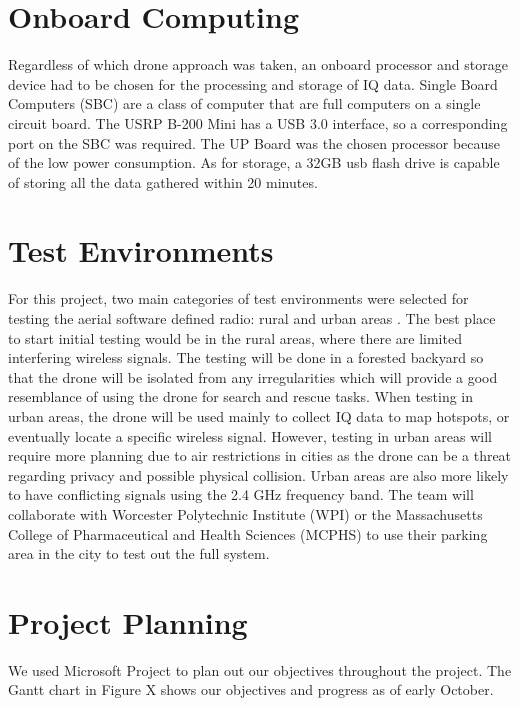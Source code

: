 \section{Onboard Computing}
Regardless of which drone approach was taken, an onboard processor and storage device had to be chosen for the processing and storage of IQ data. Single Board Computers (SBC) are a class of computer that are full computers on a single circuit board. The USRP B-200 Mini has a USB 3.0 interface, so a corresponding port on the SBC was required. The UP Board was the chosen processor because of the low power consumption. As for storage, a 32GB usb flash drive is capable of storing all the data gathered within 20 minutes.
\section{Test Environments}
For this project, two main categories of test environments were selected for testing the aerial software defined radio: rural and urban areas . The best place to start initial testing would be in the rural areas, where there are limited interfering wireless signals. The testing will be done in a forested backyard so that the drone will be isolated from any irregularities which will provide a good resemblance of using the drone for search and rescue tasks. When testing in urban areas, the drone will be used mainly to collect IQ data to map hotspots, or eventually locate a specific wireless signal. However, testing in urban areas will require more planning due to air restrictions in cities as the drone can be a threat regarding privacy and possible physical collision. Urban areas are also more likely to have conflicting signals using the 2.4 GHz frequency band. The team will collaborate with Worcester Polytechnic Institute (WPI) or the Massachusetts College of Pharmaceutical and Health Sciences (MCPHS) to use their parking area in the city to test out the full system.
\section{Project Planning}
We used Microsoft Project to plan out our objectives throughout the project. The Gantt chart in Figure X shows our objectives and progress as of early October.

